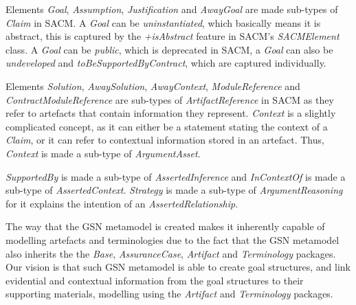 Elements \textit{Goal}, \textit{Assumption}, \textit{Justification} and \textit{AwayGoal} are made sub-types of \textit{Claim} in SACM. A \textit{Goal} can be \textit{uninstantiated}, which basically means it is abstract, this is captured by the \textit{+isAbstract} feature in SACM's \textit{SACMElement} class. A \textit{Goal} can be \textit{public}, which is deprecated in SACM, a \textit{Goal} can also be \textit{undeveloped} and \textit{toBeSupportedByContract}, which are captured individually. 

Elements \textit{Solution}, \textit{AwaySolution}, \textit{AwayContext}, \textit{ModuleReference} and \textit{ContractModuleReference} are sub-types of \textit{ArtifactReference} in SACM as they refer to artefacts that contain information they represent. \textit{Context} is a slightly complicated concept, as it can either be a statement stating the context of a \textit{Claim}, or it can refer to contextual information stored in an artefact. Thus, \textit{Context} is made a sub-type of \textit{ArgumentAsset}. 

\textit{SupportedBy} is made a sub-type of \textit{AssertedInference} and \textit{InContextOf} is made a sub-type of \textit{AssertedContext}. \textit{Strategy} is made a sub-type of \textit{ArgumentReasoning} for it explains the intention of an \textit{AssertedRelationship}.

The way that the GSN metamodel is created makes it inherently capable of modelling artefacts and terminologies due to the fact that the GSN metamodel also inherits the the \textit{Base}, \textit{AssuranceCase}, \textit{Artifact} and \textit{Terminology} packages. Our vision is that such GSN metamodel is able to create goal structures, and link evidential and contextual information from the goal structures to their supporting materials, modelling using the \textit{Artifact} and \textit{Terminology} packages. 

